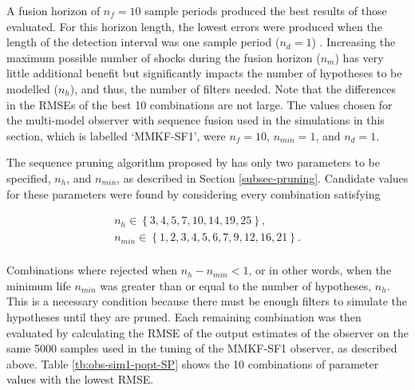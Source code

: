 A fusion horizon of $n_f=10$ sample periods produced the best results of those evaluated. For this horizon length, the lowest errors were produced when the length of the detection interval was one sample period ($n_d=1$) . Increasing the maximum possible number of shocks during the fusion horizon ($n_m$) has very little additional benefit but significantly impacts the number of hypotheses to be modelled ($n_h$), and thus, the number of filters needed. Note that the differences in the RMSEs of the best 10 combinations are not large. The values chosen for the multi-model observer with sequence fusion used in the simulations in this section, which is labelled `MMKF-SF1', were $n_f=10$, $n_{min}=1$, and $n_d=1$.

The sequence pruning algorithm proposed by \cite{andersson_adaptive_1985} has only two parameters to be specified, $n_h$, and $n_{min}$, as described in Section \ref{subsec-pruning}. Candidate values for these parameters were found by considering every combination satisfying

\begin{equation} \label{eq:sim-sys-siso-MKF-SP-param-values}
	\begin{aligned}
		n_h \in \left\{3, 4, 5, 7, 10, 14, 19, 25\right\},  \\
			n_{min} \in \left\{1, 2, 3, 4, 5, 6, 7, 9, 12, 16, 21\right\}.  \\
		\end{aligned}
	\end{equation}

Combinations where rejected when $n_h - n_{min} < 1$, or in other words, when the minimum life $n_{min}$ was greater than or equal to the number of hypotheses, $n_h$. This is a necessary condition because there must be enough filters to simulate the hypotheses until they are pruned. Each remaining combination was then evaluated by calculating the RMSE of the output estimates of the observer on the same 5000 samples used in the tuning of the MMKF-SF1 observer, as described above. Table \ref{tb:obs-sim1-popt-SP} shows the 10 combinations of parameter values with the lowest RMSE.

